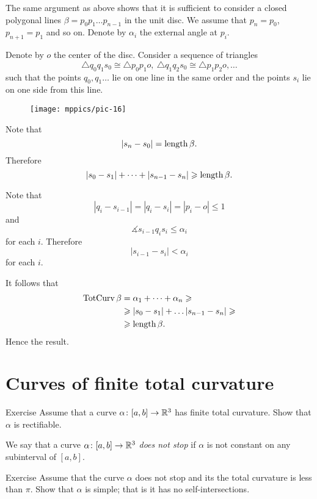 The same argument as above shows that it is sufficient to consider a closed polygonal lines $\beta=p_0p_1\dots p_{n-1}$ in the unit disc.
We assume that $p_n=p_0$, $p_{n+1}=p_1$ and so on.
Denote by $\alpha_i$ the external angle at $p_i$.

Denote by $o$ the center of the disc.
Consider a sequence of triangles 
\[\triangle q_0q_1s_0\cong \triangle p_0p_1o,\ \triangle q_1q_2s_0\cong \triangle p_1p_2o,\dots\]
such that the points $q_0,q_1\dots$ lie on one line in the same order and the points $s_i$ lie on one side from this line.

\begin{figure}[h]
\vskip-0mm
\centering
\texttt{[image: mppics/pic-16]}
\vskip0mm
\end{figure}

Note that 
\[|s_n-s_0|=\mathop{\rm length}\nolimits \beta.\]
Therefore 
\[|s_0-s_1|+\dots+|s_{n-1}-s_n|\geqslant \mathop{\rm length}\nolimits \beta.\]

Note that 
\[|q_i-s_{i-1}|=|q_i-s_i|=|p_i-o|\le 1\]
and
\[\measuredangle s_{i-1}q_is_i\le \alpha_i\]
for each $i$.
Therefore 
\[|s_{i-1}-s_i|<\alpha_i\]
for each $i$.

It follows that
\begin{align*}
\mathop{\rm TotCurv}\nolimits \beta
&=\alpha_1+\dots+\alpha_n\geqslant
\\
&\geqslant |s_{0}-s_1|+\dots |s_{n-1}-s_n|\geqslant 
\\
&\geqslant\mathop{\rm length}\nolimits \beta.
\end{align*}
Hence the result.
\qeds

\section{Curves of finite total curvature}

\begin{thm}{Exercise} 
Assume that a curve $\alpha\colon[a,b]\to\mathbb{R}^3$ has finite total curvature.
 Show that $\alpha$ is rectifiable.
\end{thm}

We say that a curve $\alpha\colon[a,b]\to\mathbb{R}^3$ \emph{does not stop} if $\alpha$ is not constant on any subinterval of $[a,b]$. 

\begin{thm}{Exercise} 
Assume that the curve $\alpha$ does not stop and its the total curvature is less than $\pi$.
Show that $\alpha$ is simple; that is it has no self-intersections.
\end{thm}

